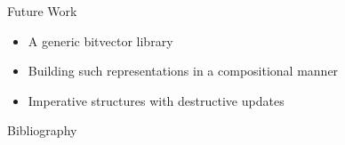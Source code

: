 \documentclass{beamer}
\begin{document}
\begin{frame}{Future Work}
\begin{itemize}
  \item A generic bitvector library
  \item Building such representations in a compositional manner
  \item Imperative structures with destructive updates
\end{itemize}
\end{frame}



\begin{frame}{Bibliography}

\end{frame}
\end{document}
